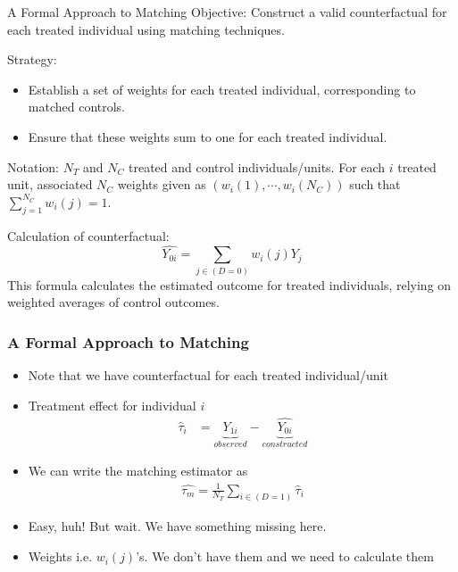 \documentclass{beamer}
\theoremstyle{plain}
\begin{document}
\begin{frame}{A Formal Approach to Matching}
	Objective: Construct a valid counterfactual for each treated individual using matching techniques.
	
	\vspace{1em}
	Strategy:
	\begin{itemize}
		\item Establish a set of weights for each treated individual, corresponding to matched controls.
		\item Ensure that these weights sum to one for each treated individual.
	\end{itemize}
	\vspace{1em}
	Notation: $N_T$ and $N_C$ treated and control individuals/units. For each $i$ treated unit, associated $N_C$ weights given as $(w_i(1), \cdots, w_i(N_C))$ such that $\sum_{j=1}^{N_C} w_i(j) = 1$. 
	
	\vspace{1em}
	Calculation of counterfactual:
	\[
	\widehat{Y_{0i}} = \sum_{j \in (D=0)} w_i(j) Y_j
	\]
	This formula calculates the estimated outcome for treated individuals, relying on weighted averages of control outcomes.
\end{frame}

\begin{frame}
	\frametitle{A Formal Approach to Matching}
	\begin{itemize}
		\item Note that we have counterfactual for each treated individual/unit
		\item Treatment effect for individual $i$
			\begin{align*}
				\widehat \tau_i &= \underbrace{Y_{1i}}_{observed}  - \underbrace{\widehat{Y_{0i}}}_{constructed}
			\end{align*}
		\item We can write the matching estimator as 
			\begin{align*}
				\widehat{\tau_m} = \frac{1}{N_T}\sum_{i\in (D=1)} \widehat \tau_i
			\end{align*}
		\pause 
		\item Easy, huh! But wait. We have something missing here.
		\pause
		\item Weights i.e. $w_i(j)$'s. We don't have them and we need to calculate them
	\end{itemize}
\end{frame}
\end{document}
